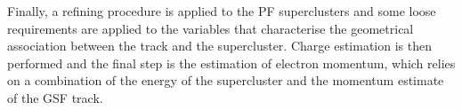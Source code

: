 Finally, a refining procedure is applied to the PF superclusters
and some loose requirements are applied to the variables that characterise the geometrical association between the track and the supercluster.
Charge estimation is then performed and the final step is the estimation of electron momentum,
which relies on a combination of the energy of the supercluster and the momentum estimate of the GSF track.



